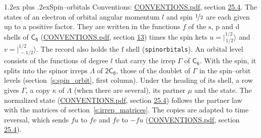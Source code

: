 \documentclass[10pt,a4paper]{article}
\makeatletter
\renewcommand\section{\@startsection{section}{1}{\z@}{-3ex plus -1ex minus -.2ex}%
  {1.2ex plus .2ex}{\normalfont\large\sffamily\bfseries\color{parttitle}}}
\numberwithin{equation}{section}
\newcommand{\grp}[1]{\mathsf{#1}}
\newcommand{\orbital}[1]{\mathrm{#1}}
\newcommand{\mult}{\kappa}
\newcommand{\intx}{\mu}
\newcommand{\jm}[2]{\bigl\lvert{}^{#1}_{\,#2}\bigr\rangle}
\makeatother
\begin{document}
\section{Spin--orbitals}\label{s:spin_orbitals}
Conventions: \href{../../CONVENTIONS.pdf}{CONVENTIONS.pdf}, section \href{../../CONVENTIONS.pdf\#conv.25.4}{25.4}.
\leavevmode\label{n:index.orbital.l}The states of an electron of orbital angular momentum $l$ and spin $\nicefrac{1}{2}$ are each given up to a positive factor. \label{n:local.spinor.uv}\label{n:local.function.f}They are written in the functions $f$ of the $\orbital{s}$, $\orbital{p}$ and $\orbital{d}$ shells of \href{../../../rotation/data/pdf/C6.pdf}{$\grp{C_{6}}$} (\href{../../CONVENTIONS.pdf}{CONVENTIONS.pdf}, section \href{../../../rotation/CONVENTIONS.pdf\#conv.13}{13}) times the spin kets $u = \jm{1/2}{1/2}$ and $v = \jm{1/2}{-1/2}$. The record also holds the $\orbital{f}$ shell (\texttt{spinorbitals}). An orbital level consists of the functions of degree $l$ that carry the irrep $\Gamma$ of \href{../../../rotation/data/pdf/C6.pdf}{$\grp{C_{6}}$}. With the spin, it splits into the spinor irreps $\Lambda$ of $\grp{2C_{6}}$, those of the doublet of $\Gamma$ in the spin--orbit levels (section~\ref{s:spin_orbit}, first column). \label{n:head.state}Under the heading of its shell, a row gives $\Gamma$, a copy $\mult$ of $\Lambda$ (when there are several), its partner $\intx$ and the state. The normalized state (\href{../../CONVENTIONS.pdf}{CONVENTIONS.pdf}, section \href{../../CONVENTIONS.pdf\#conv.25.4}{25.4}) follows the partner law with the matrices of section~\ref{s:irrep_matrices}. The copies are adapted to time reversal, which sends $f u$ to $f v$ and $f v$ to $-f u$ (\href{../../CONVENTIONS.pdf}{CONVENTIONS.pdf}, section \href{../../CONVENTIONS.pdf\#conv.25.4}{25.4}).
\end{document}
